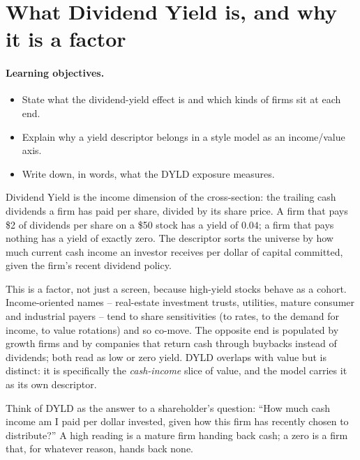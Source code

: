 \documentclass[11pt]{article}
\theoremstyle{definition}
\theoremstyle{plain}
\theoremstyle{remark}
\begin{document}
\tableofcontents
\bigskip

\section{What Dividend Yield is, and why it is a factor}\label{sec:what}

\paragraph{Learning objectives.}
\begin{itemize}[leftmargin=1.4em,topsep=2pt]
  \item State what the dividend-yield effect is and which kinds of firms sit at each end.
  \item Explain why a yield descriptor belongs in a style model as an income/value axis.
  \item Write down, in words, what the DYLD exposure measures.
\end{itemize}

Dividend Yield is the income dimension of the cross-section: the trailing cash dividends a firm has paid per share, divided by its share price. A firm that pays \$2 of dividends per share on a \$50 stock has a yield of $0.04$; a firm that pays nothing has a yield of exactly zero. The descriptor sorts the universe by how much current cash income an investor receives per dollar of capital committed, given the firm's recent dividend policy.

This is a factor, not just a screen, because high-yield stocks behave as a cohort. Income-oriented names -- real-estate investment trusts, utilities, mature consumer and industrial payers -- tend to share sensitivities (to rates, to the demand for income, to value rotations) and so co-move. The opposite end is populated by growth firms and by companies that return cash through buybacks instead of dividends; both read as low or zero yield. DYLD overlaps with value but is distinct: it is specifically the \emph{cash-income} slice of value, and the model carries it as its own descriptor.

\begin{intuition}
Think of DYLD as the answer to a shareholder's question: ``How much cash income am I paid per dollar invested, given how this firm has recently chosen to distribute?'' A high reading is a mature firm handing back cash; a zero is a firm that, for whatever reason, hands back none.
\end{intuition}
\end{document}
